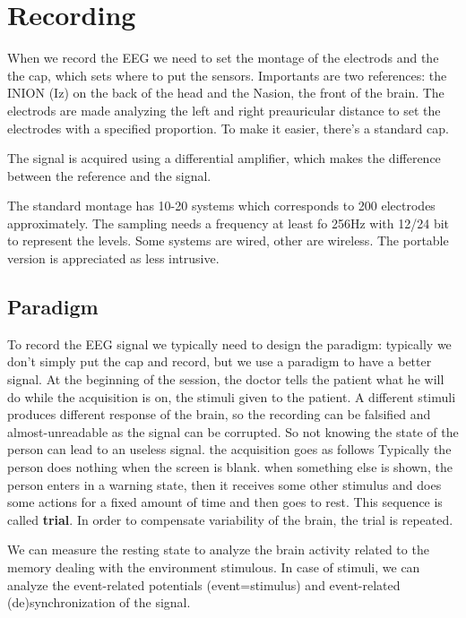 \section{Recording}
When we record the EEG we need to set the montage of the electrods and the the cap, which sets where to put the sensors. Importants are two references: the INION (Iz) on the back of the head and the Nasion, the front of the brain. The electrods are made analyzing the left and right preauricular distance to set the electrodes with a specified proportion. To make it easier, there's a standard cap.

The signal is acquired using a differential amplifier, which makes the difference between the reference and the signal.

The standard montage has 10-20 systems which corresponds to 200 electrodes approximately. The sampling needs a frequency at least fo 256Hz with 12/24 bit to represent the levels. Some systems are wired, other are wireless. The portable version is appreciated as less intrusive.
\subsection{Paradigm}
To record the EEG signal we typically need to design the paradigm: typically we don't simply put the cap and record, but we use a paradigm to have a better signal. At the beginning of the session, the doctor tells the patient what he will do while the acquisition is on, the stimuli given to the patient. A different stimuli produces different response of the brain, so the recording can be falsified and almost-unreadable as the signal can be corrupted. So not knowing the state of the person can lead to an useless signal.
the acquisition goes as follows
 Typically the person does nothing when the screen is blank. when something else is shown, the person enters in a warning state, then it receives some other stimulus and does some actions for a fixed amount of time and then goes to rest. This sequence is called \textbf{trial}. In order to compensate variability of the brain, the trial is repeated.

 We can measure the resting state to analyze the brain activity related to the memory dealing with the environment stimulous. In case of stimuli, we can analyze the event-related potentials (event=stimulus) and event-related (de)synchronization of the signal.

